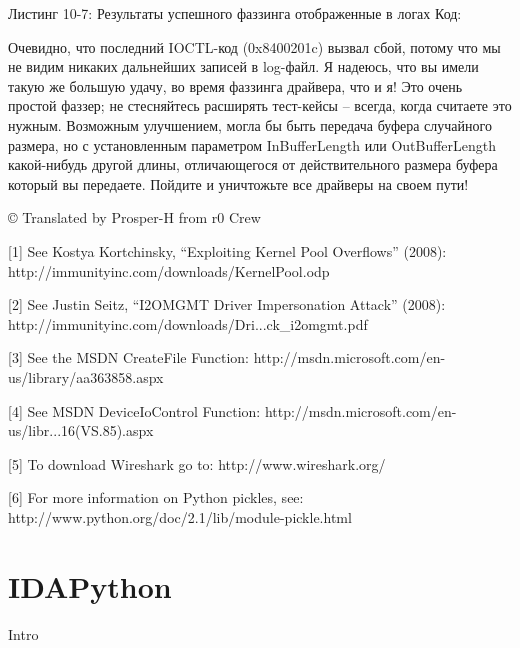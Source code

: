 \documentclass[12pt, a4paper, oneside]{book}
\begin{document}
Листинг 10-7: Результаты успешного фаззинга отображенные в логах
Код:



Очевидно, что последний IOCTL-код (0x8400201c) вызвал сбой, потому что мы не видим никаких дальнейших записей в log-файл. Я надеюсь, что вы имели такую же большую удачу, во время фаззинга драйвера, что и я! Это очень простой фаззер; не стесняйтесь расширять тест-кейсы – всегда, когда считаете это нужным. Возможным улучшением, могла бы быть передача буфера случайного размера, но с установленным параметром InBufferLength или OutBufferLength какой-нибудь другой длины, отличающегося от действительного размера буфера который вы передаете. Пойдите и уничтожьте все драйверы на своем пути!


© Translated by Prosper-H from r0 Crew


[1] See Kostya Kortchinsky, “Exploiting Kernel Pool Overflows” (2008):
http://immunityinc.com/downloads/KernelPool.odp

[2] See Justin Seitz, “I2OMGMT Driver Impersonation Attack” (2008):
http://immunityinc.com/downloads/Dri...ck\_i2omgmt.pdf

[3] See the MSDN CreateFile Function:
http://msdn.microsoft.com/en-us/library/aa363858.aspx

[4] See MSDN DeviceIoControl Function:
http://msdn.microsoft.com/en-us/libr...16(VS.85).aspx

[5] To download Wireshark go to:
http://www.wireshark.org/

[6] For more information on Python pickles, see:
http://www.python.org/doc/2.1/lib/module-pickle.html

\chapter{IDAPython}
Intro
\end{document}

